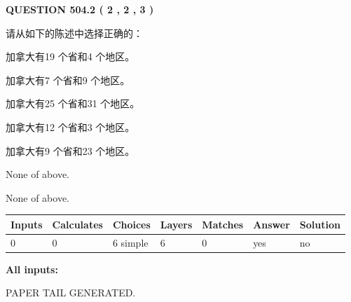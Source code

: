 \documentclass{ctexart}
\begin{document}
   
  
\vspace{0.2in}
  
{\textbf{\Large{QUESTION
504.2 
 ( 2 , 2 , 3 )
}}}
  
  
请从如下的陈述中选择正确的：
 
 
加拿大有19 个省和4 个地区。
 
 
加拿大有7 个省和9 个地区。
 
 
加拿大有25 个省和31 个地区。
 
 
加拿大有12 个省和3 个地区。
 
 
加拿大有9 个省和23 个地区。
 
 
 None of above.
 
 
\noindent{}
 
 
 None of above.
 
 
\noindent{}
 
 
   
   
   
   
\noindent\begin{tabular}{|l|l|l|l|l|l|l|}
 \hline
Inputs & Calculates & Choices & Layers & Matches & Answer & Solution \\ \hline
 0  & 
 0  & 
 6
  simple  
  & 
 6  & 
 0  & 
  yes & 
  no 
  \\ \hline
 \end{tabular}
   
   
   
   
\noindent{}
   
   
   
   
\noindent\vspace{0.1in}\hspace{-0.08in} {\textbf{\Large{All inputs: }}}
   
   
   
   
   
   
 \vspace{0.2in}
 
   
   
\vspace{2.0in} PAPER TAIL GENERATED.
   
\end{document}
